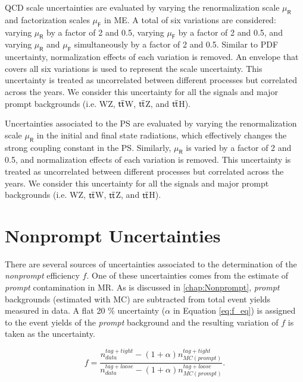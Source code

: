 \ac{QCD} scale uncertainties are evaluated by varying the renormalization scale $\mu_\textsf{R}$ and factorization scales $\mu_\textsf{F}$ in \ac{ME}.  A total of six variations are considered: varying $\mu_\textsf{R}$ by a factor of 2 and 0.5, varying $\mu_\textsf{F}$ by a factor of 2 and 0.5, and varying $\mu_\textsf{R}$ and $\mu_\textsf{F}$ simultaneously by a factor of 2 and 0.5. Similar to PDF uncertainty, normalization effects of each variation is removed. An envelope that covers all six variations is used to represent the scale uncertainty. This uncertainty is treated as uncorrelated between different processes but correlated across the years. We consider this uncertainty for all the signals and major prompt backgrounds (i.e. WZ, $\textsf{t}\overline{\textsf{t}}$W, $\textsf{t}\overline{\textsf{t}}$Z, and $\textsf{t}\overline{\textsf{t}}$H).

Uncertainties associated to the \ac{PS} are evaluated by varying the renormalization scale $\mu_\textsf{R}$ in the initial and final state radiations, which effectively changes the strong coupling constant in the \ac{PS}. Similarly, $\mu_\textsf{R}$ is varied by a factor of 2 and 0.5, and normalization effects of each variation is removed. This uncertainty is treated as uncorrelated between different processes but correlated across the years.  We consider this uncertainty for all the signals and major prompt backgrounds (i.e. WZ, $\textsf{t}\overline{\textsf{t}}$W, $\textsf{t}\overline{\textsf{t}}$Z, and $\textsf{t}\overline{\textsf{t}}$H).

\section{Nonprompt Uncertainties}
\label{sec:NonUnc}

There are several sources of uncertainties associated to the determination of the \emph{nonprompt} efficiency $f$. One of these uncertainties comes from the estimate of \emph{prompt} contamination in \ac{MR}. As is discussed in \autoref{chap:Nonprompt}, \emph{prompt} backgrounds (estimated with \ac{MC}) are subtracted from total event yields measured in data. A flat 20 $\%$ uncertainty ($\alpha$ in Equation \ref{eq:f_eq}) is assigned to the event yields of the \emph{prompt} background and the resulting variation of $f$ is taken as the uncertainty.

\begin{equation}
f=\frac{n_{data}^{tag+tight}-(1+\alpha)n_{MC(prompt)}^{tag+tight}}{n_{data}^{tag+loose}-(1+\alpha)n_{MC(prompt)}^{tag+loose}}.
\label{eq:f_eq}
\end{equation}  

